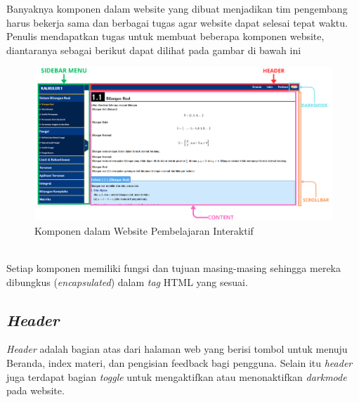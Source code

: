 \documentclass{file/KP-ITS}
\theoremstyle{definition}
\theoremstyle{definition}
\theoremstyle{plain}
\begin{document}
Banyaknya komponen dalam website yang dibuat menjadikan tim pengembang harus bekerja sama dan berbagai tugas agar website dapat selesai tepat waktu. Penulis mendapatkan tugas untuk membuat beberapa komponen website, diantaranya sebagai berikut dapat dilihat pada gambar di bawah ini
\begin{figure}[h!]
    \centering
    \includegraphics[width=\textwidth]{foto/KomponenWeb.png}
    \caption{Komponen dalam Website Pembelajaran Interaktif}
\end{figure}\\
Setiap komponen memiliki fungsi dan tujuan masing-masing sehingga mereka dibungkus (\textit{encapsulated}) dalam \textit{tag} HTML yang sesuai. 

\subsection{\textit{Header}}
\textit{Header} adalah bagian atas dari halaman web yang berisi tombol untuk menuju Beranda, index materi, dan pengisian feedback bagi pengguna. Selain itu \textit{header} juga terdapat bagian \textit{toggle} untuk mengaktifkan atau menonaktifkan \textit{darkmode} pada website.
\end{document}

